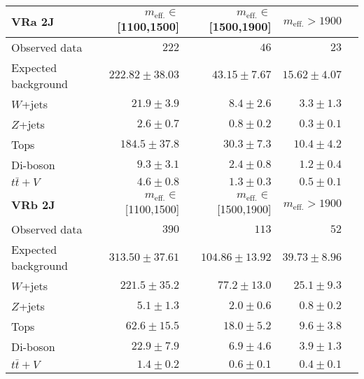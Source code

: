 \begin{table}
  \begin{center}
    \caption{ \label{tab::BGestimation::VRyields_2J}   }
    
    \begin{tabular*}{\textwidth}{@{\extracolsep{\fill}}lrrrr}
      \toprule
      \textbf{VRa 2J} & $m_{\mathrm{eff.}}\in$[1100,1500] & $m_{\mathrm{eff.}}\in$[1500,1900] & $m_{\mathrm{eff.}}>1900$ \\
      \midrule
      
Observed data          & $222$              & $46$              & $23$                    \\
\midrule
Expected background         & $222.82 \pm 38.03$          & $43.15 \pm 7.67$          & $15.62 \pm 4.07$              \\
\midrule
        $W$+jets         & $21.9 \pm 3.9$          & $8.4 \pm 2.6$          & $3.3 \pm 1.3$              \\
        $Z$+jets         & $2.6 \pm 0.7$          & $0.8 \pm 0.2$          & $0.3 \pm 0.1$              \\
        Tops         & $184.5 \pm 37.8$          & $30.3 \pm 7.3$          & $10.4 \pm 4.2$              \\
        Di-boson         & $9.3 \pm 3.1$          & $2.4 \pm 0.8$          & $1.2 \pm 0.4$              \\
        $t\bar{t}+V$         & $4.6 \pm 0.8$          & $1.3 \pm 0.3$          & $0.5 \pm 0.1$              \\
\toprule
\textbf{VRb 2J} & $m_{\mathrm{eff.}}\in$[1100,1500] & $m_{\mathrm{eff.}}\in$[1500,1900] & $m_{\mathrm{eff.}}>1900$ \\
\midrule
Observed data          & $390$              & $113$              & $52$                    \\
\midrule
Expected background         & $313.50 \pm 37.61$          & $104.86 \pm 13.92$          & $39.73 \pm 8.96$              \\
\midrule
        $W$+jets         & $221.5 \pm 35.2$          & $77.2 \pm 13.0$          & $25.1 \pm 9.3$              \\
        $Z$+jets         & $5.1 \pm 1.3$          & $2.0 \pm 0.6$          & $0.8 \pm 0.2$              \\
        Tops         & $62.6 \pm 15.5$          & $18.0 \pm 5.2$          & $9.6 \pm 3.8$              \\
        Di-boson         & $22.9 \pm 7.9$          & $6.9 \pm 4.6$          & $3.9 \pm 1.3$              \\
        $t\bar{t}+V$         & $1.4 \pm 0.2$          & $0.6 \pm 0.1$          & $0.4 \pm 0.1$              \\
        \bottomrule
        \end{tabular*}

  \end{center}
\end{table}




